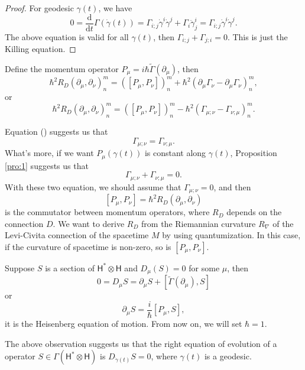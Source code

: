 \documentclass[12pt]{extarticle}
\theoremstyle{definition}
\theoremstyle{plain}
\begin{document}
\begin{proof}
For geodesic $\gamma(t)$, we have
\[
	0=\frac{\mathrm d}{\mathrm dt}\Gamma(\dot\gamma(t))=\Gamma_{i;j}\dot\gamma^i\dot\gamma^j+\Gamma_{i}\ddot\gamma_{j}^i=\Gamma_{i;j}\dot\gamma^i\dot\gamma^j.
\]
The above equation is valid for all $\gamma(t)$, then $\Gamma_{i;j}+\Gamma_{j;i}=0$. This is just the Killing equation.
\end{proof}

Define the momentum operator $P_\mu=i\hbar \widetilde{\Gamma}(\partial_\mu)$, then
\[
	\hbar^2 R_D(\partial_\mu,\partial_\nu)^m_n=([P_\mu,P_\nu])^m_n+\hbar^2(\partial_\mu\Gamma_\nu - \partial_\mu\Gamma_\nu)^m_n,
\]
or
\begin{equation}
	\hbar^2 R_D(\partial_\mu,\partial_\nu)^m_n=([P_\mu,P_\nu])^m_n-\hbar^2(\Gamma_{\mu;\nu} - \Gamma_{\nu;\mu})^m_n.
\end{equation}

Equation (\theequation) suggests us that
\[
	\Gamma_{\mu;\nu}=\Gamma_{\nu;\mu}.
\]
What's more, if we want $P_\mu(\gamma(t))$ is constant along $\gamma(t)$, Proposition \ref{pro:1} suggests us that
\[
	\Gamma_{\mu;\nu}+\Gamma_{\nu;\mu}=0.
\]
With these two equation, we should assume that $\Gamma_{\mu;\nu}=0$, and then
\[
	[P_\mu,P_\nu]=\hbar^2 R_D(\partial_\mu,\partial_\nu)
\]
is the commutator between momentum operators, where $R_D$ depends on the connection $D$. We want to derive $R_D$ from the Riemannian curvature $R_\nabla$ of the Levi-Civita connection of the spacetime $M$ by using quantumization. In this case, if the curvature of spacetime is non-zero, so is $[P_\mu,P_\nu]$.

Suppose $S$ is a section of $\mathsf{H}^*\otimes \mathsf{H}$ and $D_\mu(S)=0$ for some $\mu$, then
\[
	0=D_\mu S= \partial_\mu S+[\widetilde{\Gamma}(\partial_\mu),S]
\]
or
\[
	\partial_\mu S=\frac{i}{\hbar}[P_\mu,S],
\]
it is the Heisenberg equation of motion. From now on, we will set $\hbar=1$.

The above observation suggests us that the right equation of evolution of a operator $S\in \Gamma (\mathsf{H}^*\otimes \mathsf{H})$ is $D_{\dot\gamma(t)}S=0$, where $\gamma(t)$ is a geodesic.


\end{document}
